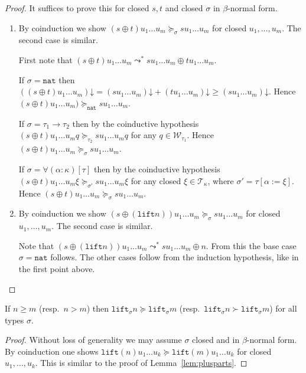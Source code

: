 \documentclass[runningheads,a4paper]{llncs}
\newcommand{\World}{\mathcal{W}}
\newcommand{\arrtype}{\rightarrow}
\newcommand{\subst}[2]{#1:=#2}
\newcommand{\Tc}{\mathcal{T}}
\newcommand{\nat}{\mathtt{nat}}
\newcommand{\lift}{\mathtt{lift}}
\newcommand{\da}{\mathord{\downarrow}}
\begin{document}
\begin{proof}
  It suffices to prove this for closed $s,t$ and closed $\sigma$ in
  $\beta$-normal form.
  \begin{enumerate}
  \item By coinduction we show $(s \oplus t) u_1 \ldots u_m
    \succeq_\sigma s u_1 \ldots u_m$ for closed $u_1,\ldots,u_m$. The
    second case is similar.

    First note that $(s \oplus t) u_1 \ldots u_m \leadsto^* s u_1
    \ldots u_m \oplus t u_1 \ldots u_m$.

    If $\sigma = \nat$ then $((s \oplus t) u_1 \ldots u_m)\da = (s u_1
    \ldots u_m)\da + (t u_1 \ldots u_m)\da \ge (s u_1 \ldots
    u_m)\da$. Hence $(s \oplus t) u_1 \ldots u_m) \succeq_\nat s u_1
    \ldots u_m$.

    If $\sigma = \tau_1\arrtype\tau_2$ then by the coinductive
    hypothesis $(s \oplus t) u_1 \ldots u_m q \succeq_{\tau_2} s u_1
    \ldots u_m q$ for any $q \in \World_{\tau_1}$. Hence $(s \oplus t)
    u_1 \ldots u_m \succeq_\sigma s u_1 \ldots u_m$.

    If $\sigma = \forall(\alpha:\kappa)[\tau]$ then by the coinductive
    hypothesis $(s \oplus t) u_1 \ldots u_m \xi \succeq_{\sigma'} s
    u_1 \ldots u_m \xi$ for any closed $\xi \in \Tc_\kappa$, where
    $\sigma' = \tau[\subst{\alpha}{\xi}]$. Hence $(s \oplus t) u_1
    \ldots u_m \succeq_\sigma s u_1 \ldots u_m$.
  \item By coinduction we show $(s \oplus (\lift n)) u_1 \ldots u_m
    \succeq_\sigma s u_1 \ldots u_m$ for closed $u_1,\ldots,u_m$. The
    second case is similar.

    Note that $(s \oplus (\lift n)) u_1 \ldots u_m \leadsto^* s u_1
    \ldots u_m \oplus n$. From this the base case $\sigma=\nat$
    follows. The other cases follow from the induction hypothesis,
    like in the first point above.
  \end{enumerate}
\end{proof}

\begin{lemma}\label{lem:liftgreater}
  If $n \geq m$ (resp.~$n > m$) then $\lift_\sigma n \succeq
  \lift_\sigma m$ (resp.~$\lift_\sigma n \succ \lift_\sigma m$) for
  all types $\sigma$.
\end{lemma}

\begin{proof}
  Without loss of generality we may assume $\sigma$ closed and in
  $\beta$-normal form. By coinduction one shows $\lift(n) u_1 \ldots
  u_k \succeq \lift(m) u_1 \ldots u_k$ for closed
  $u_1,\ldots,u_k$. This is similar to the proof of
  Lemma~\ref{lem:plusparts}.
\end{proof}
\end{document}
